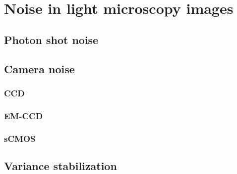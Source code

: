   


\section{Noise in light microscopy images}
  \subsection{Photon shot noise}
  \subsection{Camera noise}
    \subsubsection{CCD}
    \subsubsection{EM-CCD}
    \subsubsection{sCMOS}
  \subsection{Variance stabilization}

